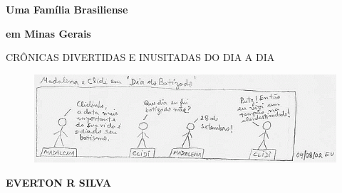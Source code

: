 

\thispagestyle{empty}  %
\pagecolor{purple}
\vspace{60mm}

{\Huge \textbf{Uma Família Brasiliense}
}                
\vspace{5mm}                
                
{\Huge \textbf{em Minas Gerais}
}                
                

\vspace{10mm}

CRÔNICAS DIVERTIDAS E INUSITADAS DO DIA A DIA

\vspace{30mm}

\begin{figure}[htb]
        \centering
        \includegraphics[scale=1]{img/HQ_pag6_B.png}
\end{figure}



\vspace{25mm}

\large{\textbf{EVERTON R SILVA}}

\vspace{25mm}

